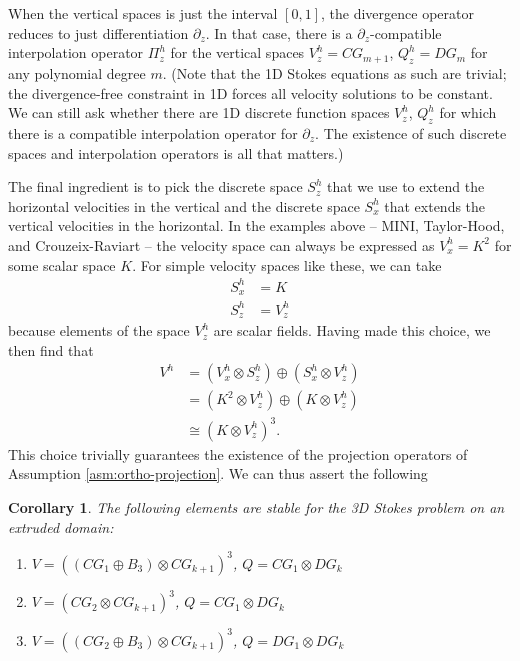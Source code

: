 \documentclass{article}
\theoremstyle{definition}
\theoremstyle{plain}
\newtheorem{cor}{Corollary}
\begin{document}
When the vertical spaces is just the interval $[0, 1]$, the divergence operator reduces to just differentiation $\partial_z$.
In that case, there is a $\partial_z$-compatible interpolation operator $\Pi_z^h$ for the vertical spaces $V_z^h = CG_{m + 1}$, $Q_z^h = DG_m$ for any polynomial degree $m$.
(Note that the 1D Stokes equations as such are trivial; the divergence-free constraint in 1D forces all velocity solutions to be constant.
We can still ask whether there are 1D discrete function spaces $V_z^h$, $Q_z^h$ for which there is a compatible interpolation operator for $\partial_z$.
The existence of such discrete spaces and interpolation operators is all that matters.)

The final ingredient is to pick the discrete space $S_z^h$ that we use to extend the horizontal velocities in the vertical and the discrete space $S_x^h$ that extends the vertical velocities in the horizontal.
In the examples above -- MINI, Taylor-Hood, and Crouzeix-Raviart -- the velocity space can always be expressed as $V_x^h = K^2$ for some scalar space $K$.
For simple velocity spaces like these, we can take
\begin{align*}
    S_x^h & = K \\
    S_z^h & = V_z^h
\end{align*}
because elements of the space $V_z^h$ are scalar fields.
Having made this choice, we then find that
\begin{align*}
    V^h & = (V_x^h\otimes S_z^h) \oplus (S_x^h \otimes V_z^h) \\
    & = (K^2\otimes V_z^h) \oplus (K\otimes V_z^h) \\
    & \cong (K \otimes V_z^h)^3.
\end{align*}
This choice trivially guarantees the existence of the projection operators of Assumption \ref{asm:ortho-projection}.
We can thus assert the following
\begin{cor} \label{cor:stable-pairs} The following elements are stable for the 3D Stokes problem on an extruded domain:
    \begin{enumerate}
        \item $V = ((CG_1 \oplus B_3) \otimes CG_{k + 1})^3$, $Q = CG_1\otimes DG_k$ 
        \item $V = (CG_2 \otimes CG_{k + 1})^3$, $Q = CG_1\otimes DG_k$
        \item $V = ((CG_2\oplus B_3) \otimes CG_{k + 1})^3$, $Q = DG_1\otimes DG_k$
    \end{enumerate}
\end{cor}
\end{document}
